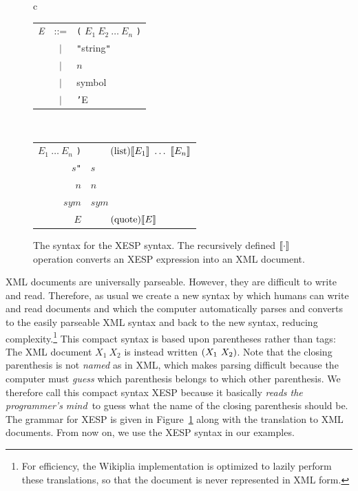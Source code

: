\documentclass[twocolumn]{article}
\begin{document}
\begin{figure}[htb]
\begin{center}
\begin{tabular}{c}
  \begin{tabular}{rcl}
   {\em E} & ::= & {\tt(} $E_1\ E_2\ \ldots\ E_n$ {\tt)} \\
           & $|$ & {\tt"}string{\tt"} \\
           & $|$ & $n$ \\
           & $|$ & symbol \\
           & $|$ & {\tt'}E \\
  \end{tabular} \\[3em]

  \begin{tabular}{r@{\,\,=\,\,}l}
   \lb {\tt(} $E_1\ \ldots\ E_n$ {\tt)}\rb & $\tag{list}{ \lb E_1 \rb\ \ldots\ \lb E_n \rb}$ \\
   \lb {\tt"}$s${\tt"}\rb & $\tag{string}{s}$ \\
   \lb $n$\rb & $\tag{int}{n}$ \\
   \lb $sym$\rb & $\tag{symbol}{sym}$ \\
   \lb {\tt'}$E$\rb & $\tag{quote}{\lb E\rb}$ \\
  \end{tabular}

\end{tabular}
\end{center}
\caption{The syntax for the XESP syntax. The recursively defined $[\![
\cdot ]\!]$ operation converts an XESP expression into an XML
document.} \label{fig:xesp}
\end{figure}

XML documents are universally parseable.\z{} However,
they are difficult to write and read. Therefore, as usual we create a new syntax by which humans can write and read
documents and which the computer automatically parses and converts to
the easily parseable XML syntax and back to the new syntax, reducing
complexity.\z\footnote{For efficiency, the Wikiplia implementation is
optimized to lazily perform these translations, so that the document
is never represented in XML form.} This compact syntax is based upon
parentheses rather than tags: The XML document $\tag{list}{X_1\ X_2}$
is instead written ${\tt(}X_1\ X_2{\tt)}$. Note that the closing
parenthesis is not {\em named} as in XML, which makes parsing
difficult because the computer must {\em guess} which parenthesis
belongs to which other parenthesis. We therefore call this compact
syntax XESP because it basically {\em reads the programmer's
mind}\, to guess what the name of the
closing parenthesis should be. The grammar for XESP is given in
Figure~\ref{fig:xesp} along with the translation to XML documents.
From now on, we use the XESP syntax in our examples.
\end{document}
